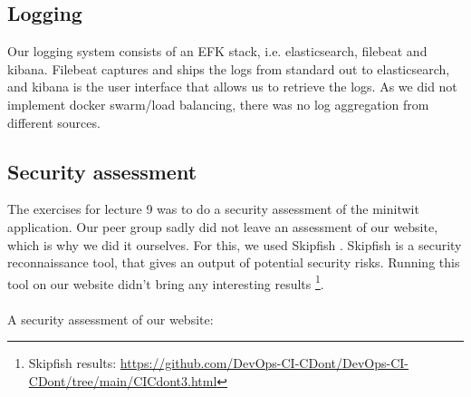 \subsection{Logging}
Our logging system consists of an EFK stack, i.e. elasticsearch, filebeat and kibana. Filebeat captures and ships the logs from standard out to  elasticsearch, and kibana is the user interface that allows us to retrieve the logs. As we did not implement docker swarm/load balancing, there was no log aggregation from different sources. \\

\subsection{Security assessment}
The exercises for lecture 9 was to do a security assessment of the minitwit application. Our peer group sadly did not leave an assessment of our website, which is why we did it ourselves. For this, we used Skipfish \cite{skipfish}. Skipfish is a security reconnaissance tool, that gives an output of potential security risks. Running this tool on our website didn't bring any interesting results \footnote{Skipfish results: \url{https://github.com/DevOps-CI-CDont/DevOps-CI-CDont/tree/main/CICdont3.html}}.
\\\\
A security assessment of our website:
